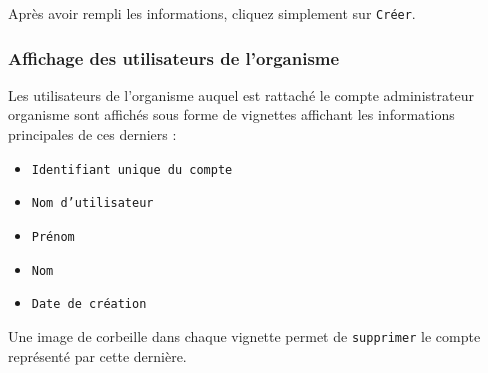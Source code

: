 Après avoir rempli les informations, cliquez simplement sur \texttt{Créer}.

\subsubsection{Affichage des utilisateurs de l'organisme}
Les utilisateurs de l'organisme auquel est rattaché le compte administrateur organisme sont affichés sous forme de vignettes affichant les informations principales de ces derniers :

\begin{itemize}
    \item \texttt{Identifiant unique du compte}
    \item \texttt{Nom d'utilisateur}
    \item \texttt{Prénom} 
    \item \texttt{Nom}
    \item \texttt{Date de création}
\end{itemize}

Une image de corbeille dans chaque vignette permet de \texttt{supprimer} le compte représenté par cette dernière.